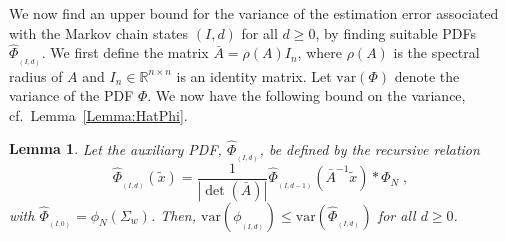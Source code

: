 \documentclass[twocolumn]{autart}
\newtheorem{lemma}[theorem]{Lemma}
\begin{document}
We now find an upper bound for the variance of the estimation error associated with the Markov chain states $(I,d)$ for all $d \ge 0$, by finding suitable PDFs $\hat{\Phi}_{_{(I,d)}}$. We first define the matrix $\bar{A} = \rho(A) I_n$, where $\rho(A)$ is the spectral radius of $A$ and $I_n \in \mathbb{R}^{n \times n}$ is an identity matrix. Let $\mathrm{var}(\Phi)$ denote the variance of the PDF $\Phi$. We now have the following bound on the variance, cf.~Lemma~\ref{Lemma:HatPhi}. \begin{lemma} \label{Lemma:HatPhiVec}
Let the auxiliary PDF, $\hat{\Phi}_{_{(I,d)}}$, be defined by the recursive relation
\begin{equation*}
\hat{\Phi}_{_{(I,d)}}(\tilde{x}) = \frac{1}{|\det(\bar{A})|}\hat{\Phi}_{_{(I,d-1)}}(\bar{A}^{-1} \tilde{x}) \ast \Phi_N \; ,
\end{equation*}
with $\hat{\Phi}_{_{(I,0)}} = \phi_N(\Sigma_w)$. Then, $\mathrm{var}(\phi_{_{(I,d)}}) \le \mathrm{var}(\hat{\Phi}_{_{(I,d)}})$ for all $d \ge 0$.
\end{lemma}
\end{document}
